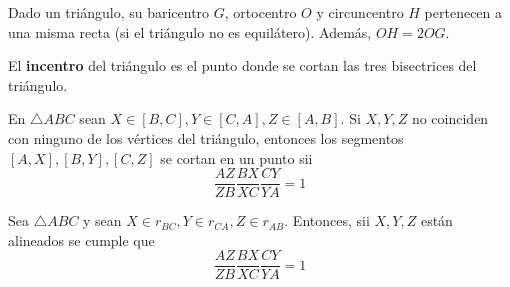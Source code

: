 Dado un triángulo, su baricentro $G$, ortocentro $O$ y circuncentro $H$ pertenecen a una misma recta (si el triángulo no es equilátero). Además, $OH = 2OG$.

\obligatorio{}

 El \textbf{incentro} del triángulo es el punto donde se cortan las tres bisectrices del triángulo.

 En $\triangle ABC$ sean $X \in [B,C], Y \in [C,A], Z \in [A,B]$. Si $X,Y,Z$ no coinciden con ninguno de los vértices del triángulo, entonces los segmentos $[A,X],[B,Y],[C,Z]$ se cortan en un punto sii
$$\frac{AZ}{ZB}\frac{BX}{XC}\frac{CY}{YA} = 1$$

 Sea $\triangle ABC$ y sean $X \in r_{BC}, Y \in r_{CA}, Z \in r_{AB}$. Entonces, sii $X,Y,Z$ están alineados se cumple que 
$$\frac{AZ}{ZB}\frac{BX}{XC}\frac{CY}{YA} = 1$$









